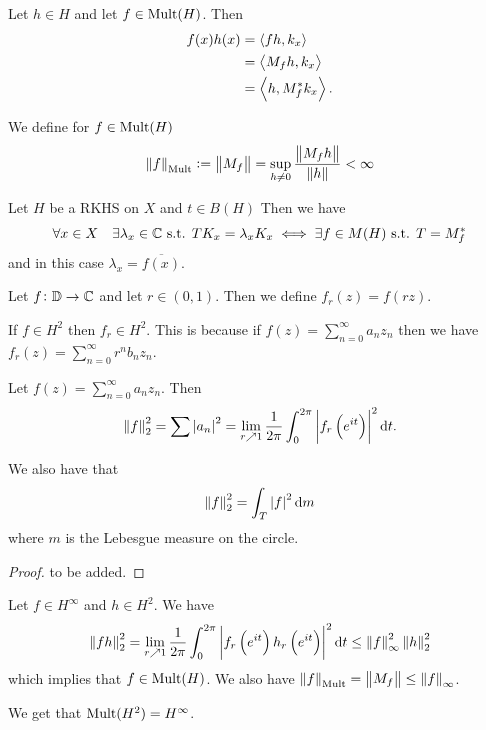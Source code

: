 \documentclass[11pt,a4paper]{article}
\begin{document}
\begin{proofof}{}
  Let $h \in H$ and let $f \in \operatorname{Mult}(H)$.
  Then
  \begin{align*}
    f(x) h(x) &= \left\langle fh, k_x \right\rangle \\
              &= \left\langle M_f h, k_x \right\rangle \\
              &= \left\langle h, M_f^* k_x \right\rangle.
  \end{align*}
\end{proofof}


\begin{definition}
  We define for $f \in \operatorname{Mult}(H)$
  \[
    \left\lVert f\right\rVert_{\operatorname{Mult}} :=
    \left\lVert M_f\right\rVert =
    \sup_{h \neq 0} \frac{\left\lVert M_f h\right\rVert}{\left\lVert h\right\rVert} < \infty
  \]
\end{definition}

\begin{proposition}
  Let $H$ be a RKHS on $X$ and $t \in B(H)$
  Then we have 
  \[
    \forall x \in X \quad \exists \lambda_x \in \mathbb{C} \text{ s.t. } T K_x = \lambda_x K_x
    \iff
    \exists f \in M(H) \text{ s.t. } T = M^*_{f}
  \]
  and in this case $\lambda_x = \overline{f(x)}$.
\end{proposition}

\begin{definition}
  Let $f \colon \mathbb{D} \to \mathbb{C}$ and let $r \in (0,1)$.
  Then we define $f_r(z) = f(rz)$.
\end{definition}
\begin{remark}
  If $f \in H^2$ then $f_r \in H^2$.
  This is because if $f(z) = \sum_{n=0}^{\infty} a_n z_n$
  then we have $f_r(z) = \sum_{n=0}^{\infty} r^n b_n z_n$. %
\end{remark}

\begin{proposition}
  Let $f(z) = \sum_{n=0}^{\infty} a_n z_n$.
  Then
  \[
    \norm{f}_{2}^{2} =
    \sum \abs{a_n}^2 =
    \lim_{r \nearrow 1}
    \frac{1}{2\pi} \int_{0}^{2\pi} \abs{f_r\del{e^{it}}}^2 \dt.
  \]
\end{proposition}
\begin{remark}
  We also have that
  \[
    \left\lVert f\right\rVert_{2}^{2} =
    \int_{T} \left\lvert f\right\rvert^2 \mathrm{d} m
  \]
  where $m$ is the Lebesgue measure on the circle.
\end{remark}
\begin{proof}
  to be added.  
\end{proof}

\begin{proposition}
  Let $f \in H^{\infty}$ and $h \in H^2$.
  We have
  \[
    \norm{f h}_{2}^{2} =
    \lim_{r \nearrow 1}
    \frac{1}{2\pi}
    \int_{0}^{2\pi} \abs{f_r\del{e^{it}} h_r\del{e^{it}}}^2 \dt \le
    \norm{f}^2_{\infty} \norm{h}_{2}^{2}
  \]
  which implies that $f \in \operatorname{Mult}(H)$.
  We also have $\left\lVert f\right\rVert_{\operatorname{Mult}} = \left\lVert M_f\right\rVert \le \left\lVert f\right\rVert_{\infty}$.
\end{proposition}
\begin{corollary}
  We get that $\operatorname{Mult}(H^2) = H^{\infty}$.
\end{corollary}
\end{document}
